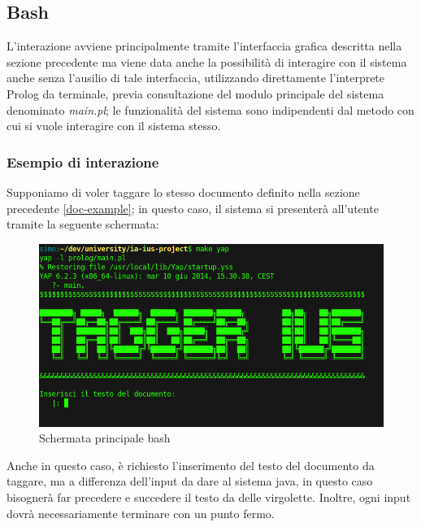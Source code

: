 \subsection{Bash}
L’interazione avviene principalmente tramite l'interfaccia grafica descritta nella sezione precedente ma viene data anche la possibilità di interagire con il sistema anche senza l'ausilio di tale interfaccia, utilizzando direttamente l'interprete Prolog da terminale, previa consultazione del modulo principale del sistema denominato \emph{main.pl}; le funzionalità del sistema sono indipendenti dal metodo con cui si vuole interagire con il sistema stesso.
\subsubsection{Esempio di interazione}
Supponiamo di voler taggare lo stesso documento definito nella sezione precedente \ref{doc-example}; in questo caso, il sistema si presenterà all'utente tramite la seguente schermata:

\begin{figure}[H]
	\includegraphics[width=1\textwidth]{img/interfaces/bash-main.png}
	\caption[Schermata bash main]{Schermata principale bash}
	\label{bash-main}
\end{figure}

Anche in questo caso, è richiesto l'inserimento del testo del documento da taggare, ma a differenza dell'input da dare al sistema java, in questo caso bisognerà far precedere e succedere il testo da delle virgolette.
Inoltre, ogni input dovrà necessariamente terminare con un punto fermo.

